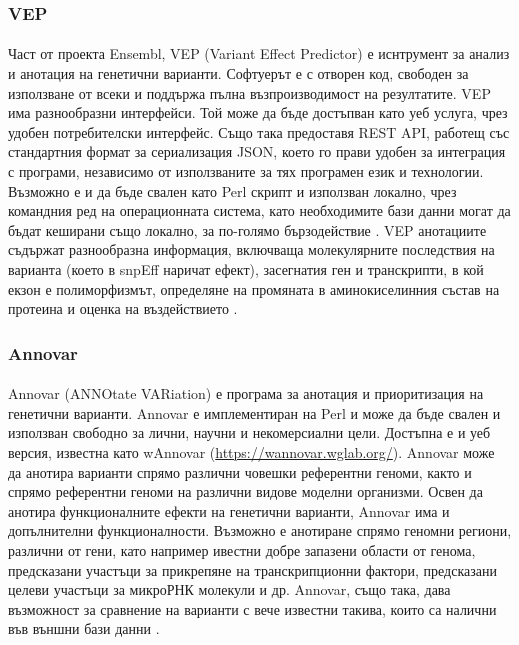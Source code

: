 \documentclass[pdftex,cyrillic,14pt,a4page,twoside,openright]{extreport}
\begin{document}
\subsubsection{VEP}
\paragraph{}
Част от проекта Ensembl, VEP (Variant Effect Predictor) е иснтрумент за анализ и анотация на генетични варианти. Софтуерът е с отворен код, свободен за използване от всеки и поддържа пълна възпроизводимост на резултатите. VEP има разнообразни интерфейси. Той може да бъде достъпван като уеб услуга, чрез удобен потребителски интерфейс. Също така предоставя REST API, работещ със стандартния формат за сериализация JSON, което го прави удобен за интеграция с програми, независимо от използваните за тях програмен език и технологии. Възможно е и да бъде свален като Perl скрипт и използван локално, чрез командния ред на операционната система, като необходимите бази данни могат да бъдат кеширани също локално, за по-голямо бързодействие \cite{mclaren2016}. VEP анотациите съдържат разнообразна информация, включваща молекулярните последствия на варианта (което в snpEff наричат ефект), засегнатия ген и транскрипти, в кой екзон е полиморфизмът, определяне на промяната в аминокиселинния състав на протеина и оценка на въздействието \cite{hunt2022}.

\subsubsection{Annovar}
\paragraph{}
Annovar (ANNOtate VARiation) е програма за анотация и приоритизация на генетични варианти. Annovar е имплементиран на Perl и може да бъде свален и използван свободно за лични, научни и некомерсиални цели. Достъпна е и уеб версия, известна като wAnnovar (\url{https://wannovar.wglab.org/}). Annovar може да анотира варианти спрямо различни човешки референтни геноми, както и спрямо референтни геноми на различни видове моделни организми. Освен да анотира функционалните ефекти на генетични варианти, Annovar има и допълнителни функционалности. Възможно е анотиране спрямо геномни региони, различни от гени, като например ивестни добре запазени области от генома, предсказани участъци за прикрепяне на транскрипционни фактори, предсказани целеви участъци за микроРНК молекули и др. Annovar, също така, дава възможност за сравнение на варианти с вече известни такива, които са налични във външни бази данни \cite{wang2010}.
\end{document}
